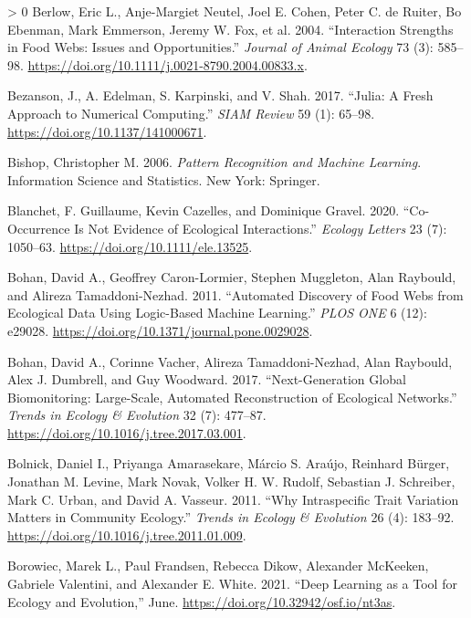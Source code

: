 \documentclass[10pt,oneside]{article}
\newlength{\cslhangindent}
\newenvironment{CSLReferences}[3] %
 {%
  \setlength{\parindent}{0pt}
  \ifodd #1 \everypar{\setlength{\hangindent}{\cslhangindent}}\ignorespaces\fi
  \ifnum #2 > 0
  \setlength{\parskip}{#2\baselineskip}
  \fi
 }%
 {}
\begin{document}
\begin{CSLReferences}{1}{0}
\leavevmode\hypertarget{ref-Berlow2004IntStr}{}%
Berlow, Eric L., Anje-Margiet Neutel, Joel E. Cohen, Peter C. de Ruiter,
Bo Ebenman, Mark Emmerson, Jeremy W. Fox, et al. 2004. {``Interaction
Strengths in Food Webs: Issues and Opportunities.''} \emph{Journal of
Animal Ecology} 73 (3): 585--98.
\url{https://doi.org/10.1111/j.0021-8790.2004.00833.x}.

\leavevmode\hypertarget{ref-Bezanson2017JulFre}{}%
Bezanson, J., A. Edelman, S. Karpinski, and V. Shah. 2017. {``Julia: A
Fresh Approach to Numerical Computing.''} \emph{SIAM Review} 59 (1):
65--98. \url{https://doi.org/10.1137/141000671}.

\leavevmode\hypertarget{ref-Bishop2006PatRec}{}%
Bishop, Christopher M. 2006. \emph{Pattern Recognition and Machine
Learning}. Information Science and Statistics. New York: Springer.

\leavevmode\hypertarget{ref-Blanchet2020CooNot}{}%
Blanchet, F. Guillaume, Kevin Cazelles, and Dominique Gravel. 2020.
{``Co-Occurrence Is Not Evidence of Ecological Interactions.''}
\emph{Ecology Letters} 23 (7): 1050--63.
\url{https://doi.org/10.1111/ele.13525}.

\leavevmode\hypertarget{ref-Bohan2011AutDis}{}%
Bohan, David A., Geoffrey Caron-Lormier, Stephen Muggleton, Alan
Raybould, and Alireza Tamaddoni-Nezhad. 2011. {``Automated Discovery of
Food Webs from Ecological Data Using Logic-Based Machine Learning.''}
\emph{PLOS ONE} 6 (12): e29028.
\url{https://doi.org/10.1371/journal.pone.0029028}.

\leavevmode\hypertarget{ref-Bohan2017NexGlo}{}%
Bohan, David A., Corinne Vacher, Alireza Tamaddoni-Nezhad, Alan
Raybould, Alex J. Dumbrell, and Guy Woodward. 2017. {``Next-Generation
Global Biomonitoring: Large-Scale, Automated Reconstruction of
Ecological Networks.''} \emph{Trends in Ecology \& Evolution} 32 (7):
477--87. \url{https://doi.org/10.1016/j.tree.2017.03.001}.

\leavevmode\hypertarget{ref-Bolnick2011WhyInt}{}%
Bolnick, Daniel I., Priyanga Amarasekare, Márcio S. Araújo, Reinhard
Bürger, Jonathan M. Levine, Mark Novak, Volker H. W. Rudolf, Sebastian
J. Schreiber, Mark C. Urban, and David A. Vasseur. 2011. {``Why
Intraspecific Trait Variation Matters in Community Ecology.''}
\emph{Trends in Ecology \& Evolution} 26 (4): 183--92.
\url{https://doi.org/10.1016/j.tree.2011.01.009}.

\leavevmode\hypertarget{ref-Borowiec2021DeeLea}{}%
Borowiec, Marek L., Paul Frandsen, Rebecca Dikow, Alexander McKeeken,
Gabriele Valentini, and Alexander E. White. 2021. {``Deep Learning as a
Tool for Ecology and Evolution,''} June.
\url{https://doi.org/10.32942/osf.io/nt3as}.


\end{CSLReferences}
\end{document}
